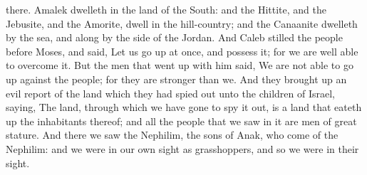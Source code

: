 there. Amalek dwelleth in the land of the South: and the Hittite, and the Jebusite, and the Amorite, dwell in the hill-country; and the Canaanite dwelleth by the sea, and along by the side of the Jordan.  And Caleb stilled the people before Moses, and said, Let us go up at once, and possess it; for we are well able to overcome it. But the men that went up with him said, We are not able to go up against the people; for they are stronger than we. And they brought up an evil report of the land which they had spied out unto the children of Israel, saying, The land, through which we have gone to spy it out, is a land that eateth up the inhabitants thereof; and all the people that we saw in it are men of great stature. And there we saw the Nephilim, the sons of Anak, who come of the Nephilim: and we were in our own sight as grasshoppers, and so we were in their sight. 


